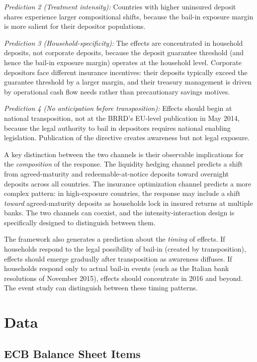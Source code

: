 \documentclass[12pt]{article}
\begin{document}
\textit{Prediction 2 (Treatment intensity):} Countries with higher uninsured deposit shares experience larger compositional shifts, because the bail-in exposure margin is more salient for their depositor populations.

\textit{Prediction 3 (Household-specificity):} The effects are concentrated in household deposits, not corporate deposits, because the deposit guarantee threshold (and hence the bail-in exposure margin) operates at the household level. Corporate depositors face different insurance incentives: their deposits typically exceed the guarantee threshold by a larger margin, and their treasury management is driven by operational cash flow needs rather than precautionary savings motives.

\textit{Prediction 4 (No anticipation before transposition):} Effects should begin at national transposition, not at the BRRD's EU-level publication in May 2014, because the legal authority to bail in depositors requires national enabling legislation. Publication of the directive creates awareness but not legal exposure.

A key distinction between the two channels is their observable implications for the \textit{composition} of the response. The liquidity hedging channel predicts a shift from agreed-maturity and redeemable-at-notice deposits toward overnight deposits across all countries. The insurance optimization channel predicts a more complex pattern: in high-exposure countries, the response may include a shift \textit{toward} agreed-maturity deposits as households lock in insured returns at multiple banks. The two channels can coexist, and the intensity-interaction design is specifically designed to distinguish between them.

The framework also generates a prediction about the \textit{timing} of effects. If households respond to the legal possibility of bail-in (created by transposition), effects should emerge gradually after transposition as awareness diffuses. If households respond only to actual bail-in events (such as the Italian bank resolutions of November 2015), effects should concentrate in 2016 and beyond. The event study can distinguish between these timing patterns.


\section{Data}

\subsection{ECB Balance Sheet Items}
\end{document}

